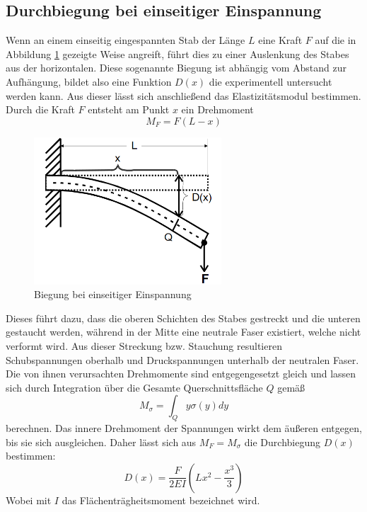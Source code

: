\subsection{Durchbiegung bei einseitiger Einspannung}
Wenn an einem einseitig eingespannten Stab der Länge $L$ eine Kraft $F$ auf die in Abbildung \ref{fig:einseitig} gezeigte Weise angreift, führt dies zu einer Auslenkung des Stabes
aus der horizontalen. Diese sogenannte Biegung ist abhängig vom Abstand zur Aufhängung, bildet also eine Funktion $D(x)$ die experimentell untersucht werden kann. 
Aus dieser lässt sich anschließend das Elastizitätsmodul bestimmen. Durch die Kraft $F$ entsteht am Punkt $x$ ein Drehmoment 
\begin{equation*}
M_F=F(L-x)
\end{equation*}
\begin{figure}
\centering
\includegraphics[width=7cm, keepaspectratio]{Biegung einseitig}
\caption{Biegung bei einseitiger Einspannung}
\label{fig:einseitig}
\end{figure}
Dieses führt dazu, dass die oberen Schichten des Stabes gestreckt und die unteren gestaucht werden, während in der Mitte eine neutrale Faser existiert,
welche nicht verformt wird. Aus dieser Streckung bzw. Stauchung resultieren Schubspannungen oberhalb und Druckspannungen unterhalb der neutralen Faser.
Die von ihnen verursachten Drehmomente sind entgegengesetzt gleich und lassen sich durch Integration über die Gesamte Querschnittsfläche $Q$ gemäß
\begin{equation*}
M_{\sigma}=\int_{Q} y\sigma (y) dy
\end{equation*}
berechnen. Das innere Drehmoment der Spannungen wirkt dem äußeren entgegen, bis sie sich ausgleichen. Daher lässt sich aus $M_F=M_{\sigma}$ die Durchbiegung 
$D(x)$ bestimmen:
\begin{equation}
D(x)=\frac{F}{2EI}(Lx^2-\frac{x^3}{3})
\end{equation}
Wobei mit $I$ das Flächenträgheitsmoment bezeichnet wird. \\
